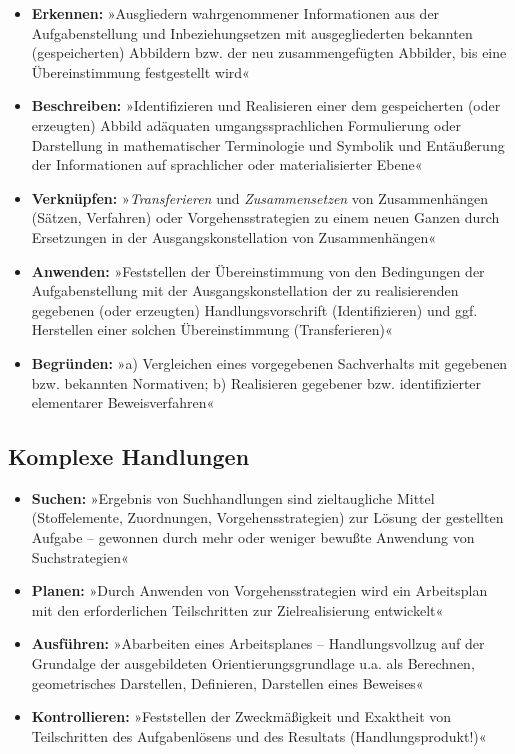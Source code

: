 \documentclass[
]{scrbook}
\providecommand{\tightlist}{%
  \setlength{\itemsep}{0pt}\setlength{\parskip}{0pt}}
\theoremstyle{definition}
\theoremstyle{definition}
\theoremstyle{definition}
\theoremstyle{definition}
\theoremstyle{remark}
\begin{document}
\begin{itemize}
\tightlist
\item
  \textbf{Erkennen:} »Ausgliedern wahrgenommener Informationen aus der Aufgabenstellung und Inbeziehungsetzen mit ausgegliederten bekannten (gespeicherten) Abbildern bzw. der neu zusammengefügten Abbilder, bis eine Übereinstimmung festgestellt wird«
\item
  \textbf{Beschreiben:} »Identifizieren und Realisieren einer dem gespeicherten (oder erzeugten) Abbild adäquaten umgangssprachlichen Formulierung oder Darstellung in mathematischer Terminologie und Symbolik und Entäußerung der Informationen auf sprachlicher oder materialisierter Ebene«
\item
  \textbf{Verknüpfen:} »\emph{Transferieren} und \emph{Zusammensetzen} von Zusammenhängen (Sätzen, Verfahren) oder Vorgehensstrategien zu einem neuen Ganzen durch Ersetzungen in der Ausgangskonstellation von Zusammenhängen«
\item
  \textbf{Anwenden:} »Feststellen der Übereinstimmung von den Bedingungen der Aufgabenstellung mit der Ausgangskonstellation der zu realisierenden gegebenen (oder erzeugten) Handlungsvorschrift (Identifizieren) und ggf. Herstellen einer solchen Übereinstimmung (Transferieren)«
\item
  \textbf{Begründen:} »a) Vergleichen eines vorgegebenen Sachverhalts mit gegebenen bzw. bekannten Normativen; b) Realisieren gegebener bzw. identifizierter elementarer Beweisverfahren«
\end{itemize}

\hypertarget{komplexe-handlungen}{%
\subsection{Komplexe Handlungen}\label{komplexe-handlungen}}

\begin{itemize}
\tightlist
\item
  \textbf{Suchen:} »Ergebnis von Suchhandlungen sind zieltaugliche Mittel (Stoffelemente, Zuordnungen, Vorgehensstrategien) zur Lösung der gestellten Aufgabe -- gewonnen durch mehr oder weniger bewußte Anwendung von Suchstrategien«
\item
  \textbf{Planen:} »Durch Anwenden von Vorgehensstrategien wird ein Arbeitsplan mit den erforderlichen Teilschritten zur Zielrealisierung entwickelt«
\item
  \textbf{Ausführen:} »Abarbeiten eines Arbeitsplanes -- Handlungsvollzug auf der Grundalge der ausgebildeten Orientierungsgrundlage u.a. als Berechnen, geometrisches Darstellen, Definieren, Darstellen eines Beweises«
\item
  \textbf{Kontrollieren:} »Feststellen der Zweckmäßigkeit und Exaktheit von Teilschritten des Aufgabenlösens und des Resultats (Handlungsprodukt!)«
\end{itemize}
\end{document}
